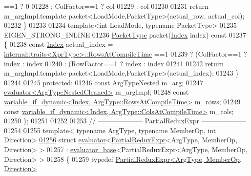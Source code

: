 \begin{DoxyCode}
      ==1 ? 0
01228                            : ColFactor==1 ? col
01229                            : col %
01230 
01231     \textcolor{keywordflow}{return} m\_argImpl.template packet<LoadMode,PacketType>(actual\_row, actual\_col);
01232   \}
01233   
01234   \textcolor{keyword}{template}<\textcolor{keywordtype}{int} LoadMode, \textcolor{keyword}{typename} PacketType>
01235   EIGEN\_STRONG\_INLINE
01236   \hyperlink{struct_eigen_1_1_packet_type}{PacketType} packet(\hyperlink{namespace_eigen_a62e77e0933482dafde8fe197d9a2cfde}{Index} index)\textcolor{keyword}{ const}
01237 \textcolor{keyword}{  }\{
01238     \textcolor{keyword}{const} \hyperlink{namespace_eigen_a62e77e0933482dafde8fe197d9a2cfde}{Index} actual\_index = \hyperlink{struct_eigen_1_1internal_1_1traits}{internal::traits<XprType>::RowsAtCompileTime}
      ==1
01239                                   ? (ColFactor==1 ?  index : index%
01240                                   : (RowFactor==1 ?  index : index%
01241 
01242     \textcolor{keywordflow}{return} m\_argImpl.template packet<LoadMode,PacketType>(actual\_index);
01243   \}
01244  
01245 \textcolor{keyword}{protected}:
01246   \textcolor{keyword}{const} ArgTypeNested m\_arg;
01247   \hyperlink{struct_eigen_1_1internal_1_1evaluator}{evaluator<ArgTypeNestedCleaned>} m\_argImpl;
01248   \textcolor{keyword}{const} \hyperlink{class_eigen_1_1internal_1_1variable__if__dynamic}{variable\_if\_dynamic<Index, ArgType::RowsAtCompileTime>}
       m\_rows;
01249   \textcolor{keyword}{const} \hyperlink{class_eigen_1_1internal_1_1variable__if__dynamic}{variable\_if\_dynamic<Index, ArgType::ColsAtCompileTime>}
       m\_cols;
01250 \};
01251 
01252 
01253 \textcolor{comment}{// -------------------- PartialReduxExpr --------------------}
01254 
01255 \textcolor{keyword}{template}< \textcolor{keyword}{typename} ArgType, \textcolor{keyword}{typename} MemberOp, \textcolor{keywordtype}{int} Direction>
\hyperlink{struct_eigen_1_1internal_1_1evaluator_3_01_partial_redux_expr_3_01_arg_type_00_01_member_op_00_01_direction_01_4_01_4}{01256} \textcolor{keyword}{struct }\hyperlink{struct_eigen_1_1internal_1_1evaluator}{evaluator}<\hyperlink{group___core___module_class_eigen_1_1_partial_redux_expr}{PartialReduxExpr}<ArgType, MemberOp, Direction> >
01257   : \hyperlink{struct_eigen_1_1internal_1_1evaluator__base}{evaluator\_base}<PartialReduxExpr<ArgType, MemberOp, Direction> >
01258 \{
01259   \textcolor{keyword}{typedef} \hyperlink{group___core___module_class_eigen_1_1_partial_redux_expr}{PartialReduxExpr<ArgType, MemberOp, Direction>} 

\end{DoxyCode}
